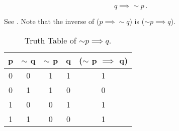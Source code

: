 %
%

\begin{subquestions}
	

\subquestion

\begin{equation}
	q \implies \sim p\,. 
\end{equation}


\subquestion

See . Note that the inverse of ($p \implies \sim q$) is ($\sim p \implies q$).
\begin{table}[ht]
	\centering
	\begin{tabular}{|c|c|c|c|c|}
		\hline
		p & $\sim$ q & $\sim$ p & q & ($\sim$ p $\implies$ q) \\
		\hline
		0 & 0 & 1 & 1 & 1 \\
		0 & 1 & 1 & 0 & 0 \\
		1 & 0 & 0 & 1 & 1 \\
		1 & 1 & 0 & 0 & 1 \\
		\hline
	\end{tabular}
	\caption{\label{2014:q1:tab:Tab1} Truth Table of $\sim p \implies q$.}
\end{table}
		
		

\end{subquestions}
